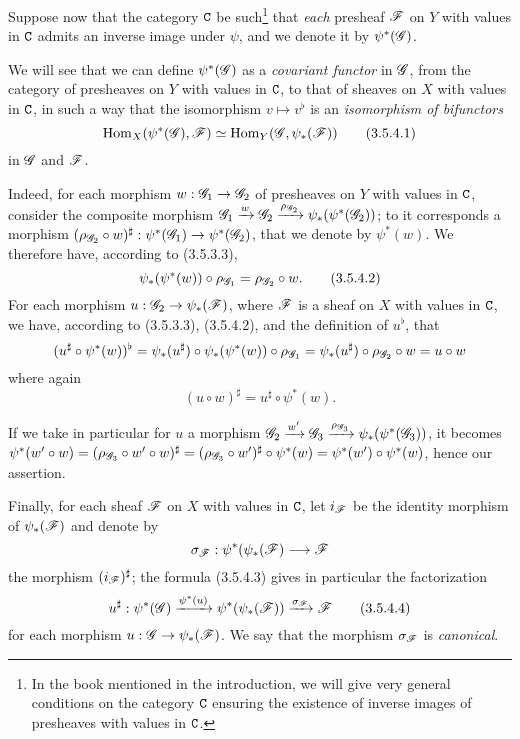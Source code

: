 \begin{env}[3.5.4]
\label{0.3.5.4}
Suppose now that the category $\mathtt{C}$ be such\footnote{In the book mentioned in the
introduction, we will give very general conditions on the category $\mathtt{C}$ ensuring
the existence of inverse images of presheaves with values in $\mathtt{C}$.} that
\emph{each} presheaf $\mathscr{F}$ on $Y$ with values in $\mathtt{C}$ admits an inverse image
under $\psi$, and we denote it by $\psi^*(\mathscr{G})$.

We will see that we can define $\psi^*(\mathscr{G})$ as a \emph{covariant functor} in
$\mathscr{G}$, from the category of presheaves on $Y$ with values in $\mathtt{C}$, to that of
sheaves on $X$ with values in $\mathtt{C}$, in such a way that the isomorphism
$v\mapsto v^\flat$ is an \emph{isomorphism of bifunctors}
\[
  {\mathop{\mathrm{Hom}}\nolimits}_X(\psi^*(\mathscr{G}),\mathscr{F})\simeq{\mathop{\mathrm{Hom}}\nolimits}_Y(\mathscr{G},\psi_*(\mathscr{F}))
  \tag{3.5.4.1}
\]
in $\mathscr{G}$ and $\mathscr{F}$.

Indeed, for each morphism $w:\sh{G}_1\to\sh{G}_2$ of presheaves on $Y$ with
values in $\mathtt{C}$, consider the composite morphism
$\mathscr{G}_1\xrightarrow{w}\mathscr{G}_2
  \xrightarrow{\rho_{\mathscr{G}_2}}\psi_*(\psi^*(\mathscr{G}_2))$; to it corresponds a
morphism $(\rho_{\sh{G}_2}\circ w)^\sharp:\psi^*(\sh{G}_1)\to\psi^*(\sh{G}_2)$,
that we denote by $\psi^*(w)$. We therefore have, according to (3.5.3.3),
\[
  \psi_*(\psi^*(w))\circ\rho_{\mathscr{G}_1}=\rho_{\mathscr{G}_2}\circ w.
  \tag{3.5.4.2}
\]
For each morphism $u:\sh{G}_2\to\psi_*(\sh{F})$, where $\mathscr{F}$ is a sheaf on
$X$ with values in $\mathtt{C}$, we have, according to (3.5.3.3), (3.5.4.2), and the
definition of $u^\flat$, that
\[
  (u^\sharp\circ\psi^*(w))^\flat
  =\psi_*(u^\sharp)\circ\psi_*(\psi^*(w))\circ\rho_{\mathscr{G}_1}
  =\psi_*(u^\sharp)\circ\rho_{\mathscr{G}_2}\circ w=u\circ w
\]
where again
\[
  (u\circ w)^\sharp=u^\sharp\circ\psi^*(w).
  \tag{3.5.4.3}
\]

If we take in particular for $u$ a morphism
$\mathscr{G}_2\xrightarrow{w'}\mathscr{G}_3
  \xrightarrow{\rho_{\mathscr{G}_3}}\psi_*(\psi^*(\mathscr{G}_3))$, it becomes
$\psi^*(w'\circ w)=(\rho_{\mathscr{G}_3}\circ w'\circ w)^\sharp
  =(\rho_{\mathscr{G}_3}\circ w')^\sharp\circ\psi^*(w)=\psi^*(w')\circ\psi^*(w)$,
hence our assertion.

Finally, for each sheaf $\mathscr{F}$ on $X$ with values in $\mathtt{C}$, let $i_\mathscr{F}$ be
the identity morphism of $\psi_*(\mathscr{F})$ and denote by
\[
  \sigma_\sh{F}:\psi^*(\psi_*(\sh{F})\to\sh{F}
\]
the morphism $(i_\mathscr{F})^\sharp$; the formula (3.5.4.3) gives in particular the
factorization
\[
  u^\sharp:\psi^*(\mathscr{G})\xrightarrow{\psi^*(u)}\psi^*(\psi_*(\mathscr{F}))
  \xrightarrow{\sigma_\mathscr{F}}\mathscr{F}
  \tag{3.5.4.4}
\]
for each morphism $u:\sh{G}\to\psi_*(\sh{F})$. We say that the morphism
$\sigma_\mathscr{F}$ is \emph{canonical}.
\end{env}

